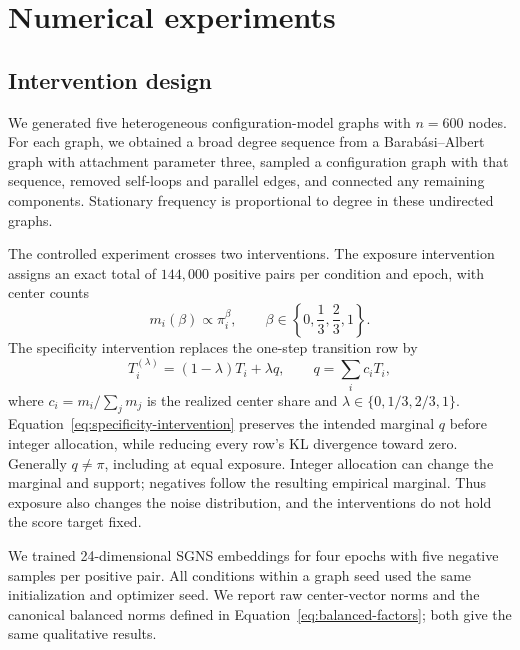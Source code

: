 \documentclass[aps,pre,reprint,superscriptaddress,longbibliography]{revtex4-2}
\begin{document}
\section{Numerical experiments}
\label{sec:numerical-experiments}

\subsection{Intervention design}

We generated five heterogeneous configuration-model graphs with \(n=600\) nodes.
For each graph, we obtained a broad degree sequence from a Barab\'asi--Albert graph with attachment parameter three, sampled a configuration graph with that sequence, removed self-loops and parallel edges, and connected any remaining components.
Stationary frequency is proportional to degree in these undirected graphs.

The controlled experiment crosses two interventions.
The exposure intervention assigns an exact total of \(144{,}000\) positive pairs per condition and epoch, with center counts
\begin{equation}
    m_i(\beta)
    \propto
    \pi_i^\beta,
    \qquad
    \beta\in\left\{0,\frac{1}{3},\frac{2}{3},1\right\}.
    \label{eq:exposure-intervention}
\end{equation}
The specificity intervention replaces the one-step transition row by
\begin{equation}
    T_i^{(\lambda)}
    =
    (1-\lambda)T_i+\lambda q,
    \qquad
    q=\sum_i c_iT_i,
    \label{eq:specificity-intervention}
\end{equation}
where \(c_i=m_i/\sum_jm_j\) is the realized center share and \(\lambda\in\{0,1/3,2/3,1\}\).
Equation~\eqref{eq:specificity-intervention} preserves the intended marginal \(q\) before integer allocation, while reducing every row's KL divergence toward zero.
Generally \(q\neq\pi\), including at equal exposure.
Integer allocation can change the marginal and support; negatives follow the resulting empirical marginal.
Thus exposure also changes the noise distribution, and the interventions do not hold the score target fixed.

We trained 24-dimensional SGNS embeddings for four epochs with five negative samples per positive pair.
All conditions within a graph seed used the same initialization and optimizer seed.
We report raw center-vector norms and the canonical balanced norms defined in Equation~\eqref{eq:balanced-factors}; both give the same qualitative results.
\end{document}
